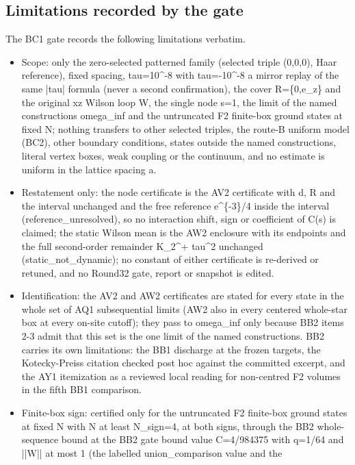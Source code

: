 \subsection{Limitations recorded by the gate}
\label{sec:bc1-limits}
The BC1 gate records the following limitations verbatim.
\begin{gatequote}
\begin{itemize}
\item Scope: only the zero-selected patterned family (selected triple (0,0,0),
Haar reference), fixed spacing, tau=10\textasciicircum{}-8 with
tau=-10\textasciicircum{}-8 a mirror replay of the same |tau| formula (never a
second confirmation), the cover R=\{0,e\_z\} and the original xz Wilson loop
W, the single node s=1, the limit of the named constructions omega\_inf and
the untruncated F2 finite-box ground states at fixed N; nothing transfers to
other selected triples, the route-B uniform model (BC2), other boundary
conditions, states outside the named constructions, literal vertex boxes, weak
coupling or the continuum, and no estimate is uniform in the lattice spacing
a.
\item Restatement only: the node certificate is the AV2 certificate with d, R
and the interval unchanged and the free reference e\textasciicircum{}\{-3\}/4
inside the interval (reference\_unresolved), so no interaction shift, sign or
coefficient of C(s) is claimed; the static Wilson mean is the AW2 enclosure
with its endpoints and the full second-order remainder K\_2\textasciicircum{}+
tau\textasciicircum{}2 unchanged (static\_not\_dynamic); no constant of either
certificate is re-derived or retuned, and no Round32 gate, report or snapshot
is edited.
\item Identification: the AV2 and AW2 certificates are stated for every state
in the whole set of AQ1 subsequential limits (AW2 also in every centered
whole-star box at every on-site cutoff); they pass to omega\_inf only because
BB2 items 2-3 admit that this set is the one limit of the named constructions.
BB2 carries its own limitations: the BB1 discharge at the frozen targets, the
Kotecky-Preiss citation checked post hoc against the committed excerpt, and
the AY1 itemization as a reviewed local reading for non-centred F2 volumes in
the fifth BB1 comparison.
\item Finite-box sign: certified only for the untruncated F2 finite-box ground
states at fixed N with N at least N\_sign=4, at both signs, through the BB2
whole-sequence bound at the BB2 gate bound value C\textquotesingle{}=4/984375
with q=1/64 and ||W|| at most 1 (the labelled union\_comparison value and the

\end{itemize}
\end{gatequote}
